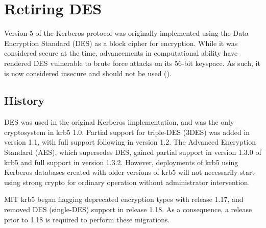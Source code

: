 \documentclass[letterpaper,10pt,english]{sphinxmanual}
\begin{document}
\section{Retiring DES}
\label{\detokenize{admin/advanced/retiring-des:retiring-des}}\label{\detokenize{admin/advanced/retiring-des::doc}}\label{\detokenize{admin/advanced/retiring-des:id1}}
Version 5 of the Kerberos protocol was originally implemented using
the Data Encryption Standard (DES) as a block cipher for encryption.
While it was considered secure at the time, advancements in computational
ability have rendered DES vulnerable to brute force attacks on its 56-bit
keyspace.  As such, it is now considered insecure and should not be
used ().


\subsection{History}
\label{\detokenize{admin/advanced/retiring-des:history}}
DES was used in the original Kerberos implementation, and was the
only cryptosystem in krb5 1.0.  Partial support for triple-DES (3DES) was
added in version 1.1, with full support following in version 1.2.
The Advanced Encryption Standard (AES), which supersedes DES, gained
partial support in version 1.3.0 of krb5 and full support in version 1.3.2.
However, deployments of krb5 using Kerberos databases created with older
versions of krb5 will not necessarily start using strong crypto for
ordinary operation without administrator intervention.

MIT krb5 began flagging deprecated encryption types with release 1.17,
and removed DES (single-DES) support in release 1.18.  As a
consequence, a release prior to 1.18 is required to perform these
migrations.
\end{document}
